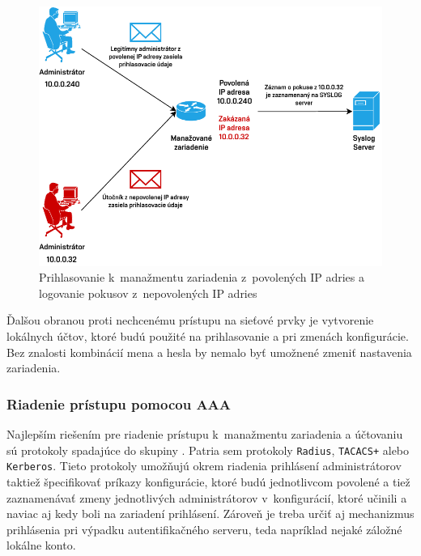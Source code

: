 \begin{figure}[H]
	\begin{center}
		\includegraphics[scale=1]{obrazky/login-log.pdf}
	\end{center}
	\caption[Prihlasovanie k~manažmentu zariadenia z~povolených IP adries a logovanie pokusov z~nepovolených IP adries]{Prihlasovanie k~manažmentu zariadenia z~povolených IP adries a logovanie pokusov z~nepovolených IP adries}
	\label{fig:login-log-mngmt}
\end{figure} 

\newpage
Ďalšou obranou proti nechcenému prístupu na sieťové prvky je vytvorenie lokálnych účtov, ktoré budú použité na prihlasovanie a pri zmenách konfigurácie. Bez znalosti kombinácií mena a hesla by nemalo byť umožnené zmeniť nastavenia zariadenia.  

\subsubsection*{Riadenie prístupu pomocou AAA}
Najlepším riešením pre riadenie prístupu k~manažmentu zariadenia a účtovaniu sú protokoly spadajúce do skupiny . Patria sem protokoly \texttt{Radius}, \texttt{TACACS+} alebo \texttt{Kerberos}. Tieto protokoly umožňujú okrem riadenia prihlásení administrátorov taktiež špecifikovať príkazy konfigurácie, ktoré budú jednotlivcom povolené a tiež zaznamenávať zmeny jednotlivých administrátorov v~konfigurácií, ktoré učinili a naviac aj kedy boli na zariadení prihlásení. Zároveň je treba určiť aj mechanizmus prihlásenia pri výpadku autentifikačného serveru, teda napríklad nejaké záložné lokálne konto.

